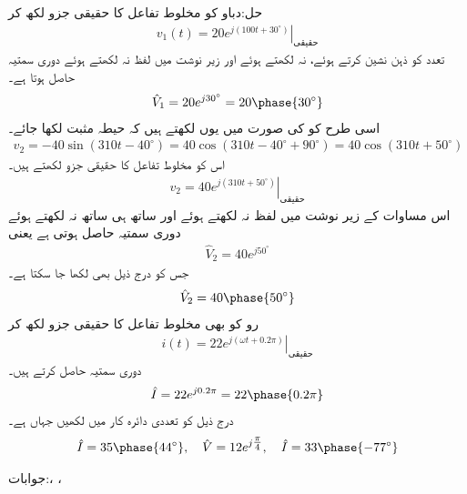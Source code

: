 حل:دباو  کو مخلوط تفاعل کا حقیقی جزو لکھ کر
\begin{align*}
v_1(t)=\left. 20 e^{j(100 t+30^{\circ})}\right|_{\text{حقیقی}}
\end{align*}
تعدد کو ذہن نشین کرتے ہوئے،   نہ لکھتے  ہوئے اور زیر نوشت میں لفظ  نہ لکھتے ہوئے  دوری سمتیہ حاصل ہوتا ہے۔
\begin{align*}
\hat{V}_1=20 e^{j30^{\circ}}=20\phase{30^{\circ}}
\end{align*}
اسی طرح  کو  کی صورت میں یوں لکھتے ہیں کہ حیطہ مثبت لکھا جائے۔
\begin{align*}
v_2=-40 \sin(310t-40^{\circ})=40 \cos (310 t-40^{\circ}+90^{\circ})=40 \cos (310t+50^{\circ})
\end{align*} 
اس کو مخلوط تفاعل کا حقیقی جزو لکھتے ہیں۔
\begin{align*}
v_2=\left.40 e^{j(310t+50^{\circ})}\right|_{\text{حقیقی}}
\end{align*} 
اس مساوات کے زیر نوشت میں لفظ  نہ لکھتے ہوئے اور ساتھ ہی ساتھ  نہ لکھتے ہوئے دوری سمتیہ حاصل ہوتی ہے یعنی
\begin{align*}
\hat{V}_2=40 e^{ j50^{\circ}}
\end{align*} 
جس کو درج ذیل بھی لکھا جا سکتا ہے۔
\begin{align*}
\hat{V}_2=40 \phase{50^{\circ}}
\end{align*} 
رو کو بھی مخلوط تفاعل کا حقیقی جزو لکھ کر
\begin{align*}
i(t)=\left. 22 e^{j(\omega t+0.2\pi)} \right|_{\text{حقیقی}}
\end{align*}
دوری سمتیہ حاصل کرتے ہیں۔
\begin{align*}
\hat{I}=22 e^{j 0.2\pi}=22\phase{0.2 \pi}
\end{align*}
درج ذیل کو تعددی دائرہ کار میں لکھیں جہاں  ہے۔
\begin{align*}
\hat{I}=35\phase{44^{\circ}}, \quad \hat{V}=12 e^{j\tfrac{\pi}{4}}, \quad \hat{I}=33\phase{-77^{\circ}}
\end{align*}

جوابات:، ،\\

